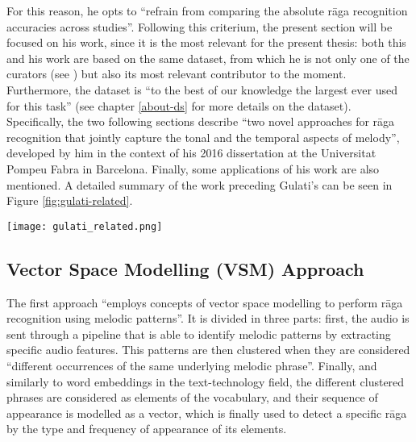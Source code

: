 For this reason, he opts to ``refrain from comparing the absolute r\=aga recognition accuracies across studies''\cite[p.37]{gulati}. Following this criterium, the present section will be focused on his work, since it is the most relevant for the present thesis: both this and his work are based on the same dataset, from which he is not only one of the curators (see \cite{indian-corpora}) but also its most relevant contributor to the moment. Furthermore, the dataset is ``to the best of our knowledge the largest ever used for this task''\cite[p.178]{gulati} (see chapter \ref{about-ds} for more details on the dataset).\\

Specifically, the two following sections describe ``two novel approaches for rāga recognition that jointly capture the tonal and the temporal aspects of melody'', developed by him in the context of his 2016 dissertation at the Universitat Pompeu Fabra in Barcelona. Finally, some applications of his work are also mentioned. A detailed summary of the work preceding Gulati's can be seen in Figure \ref{fig:gulati-related}.

\begin{sidewaysfigure}%
  \centering
  \texttt{[image: gulati\_related.png]}
  \caption{Summary of the r\=aga recognition methods in cronological order (from \cite[p.39]{gulati})}
  \label{fig:gulati-related}
\end{sidewaysfigure}



\subsection{Vector Space Modelling (VSM) Approach}

The first approach ``employs concepts of vector space modelling to perform r\=aga recognition using melodic patterns''. It is divided in three parts: first, the audio is sent through a pipeline that is able to identify melodic patterns by extracting specific audio features. This patterns are then clustered when they are considered ``different occurrences of the same underlying melodic phrase''. Finally, and similarly to word embeddings in the text-technology field, the different clustered phrases are considered as elements of the vocabulary, and their sequence of appearance is modelled as a vector, which is finally used to detect a specific r\=aga by the type and frequency of appearance of its elements.\\


